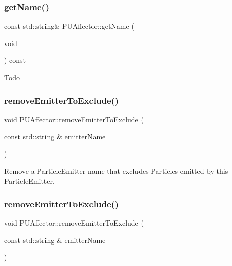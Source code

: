 \subsubsection{\texorpdfstring{get\+Name()}{getName()}\hspace{0.1cm}{\footnotesize\ttfamily [2/2]}}
{\footnotesize\ttfamily const std\+::string\& P\+U\+Affector\+::get\+Name (\begin{DoxyParamCaption}\item[{void}]{ }\end{DoxyParamCaption}) const\hspace{0.3cm}{\ttfamily [inline]}}

Todo \mbox{\label{classPUAffector_a3656722deeec360894ccb7637b597516}} 
\subsubsection{\texorpdfstring{remove\+Emitter\+To\+Exclude()}{removeEmitterToExclude()}\hspace{0.1cm}{\footnotesize\ttfamily [1/2]}}
{\footnotesize\ttfamily void P\+U\+Affector\+::remove\+Emitter\+To\+Exclude (\begin{DoxyParamCaption}\item[{const std\+::string \&}]{emitter\+Name }\end{DoxyParamCaption})}

Remove a Particle\+Emitter name that excludes Particles emitted by this Particle\+Emitter. \mbox{\label{classPUAffector_a3656722deeec360894ccb7637b597516}} 
\subsubsection{\texorpdfstring{remove\+Emitter\+To\+Exclude()}{removeEmitterToExclude()}\hspace{0.1cm}{\footnotesize\ttfamily [2/2]}}
{\footnotesize\ttfamily void P\+U\+Affector\+::remove\+Emitter\+To\+Exclude (\begin{DoxyParamCaption}\item[{const std\+::string \&}]{emitter\+Name }\end{DoxyParamCaption})}

